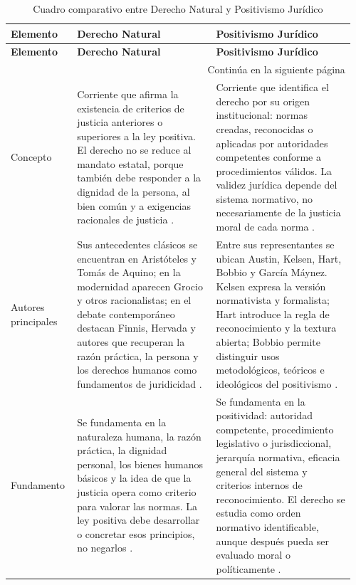 \documentclass[
	spanish, %
	letterpaper, oneside
]{article}
\begin{document}
\clearpage
\pagestyle{empty}
\begin{landscape}
\begingroup
\scriptsize
\setlength{\tabcolsep}{4pt}
\renewcommand{\arraystretch}{1.35}
\begin{longtable}{@{}p{0.18\linewidth}p{0.39\linewidth}p{0.39\linewidth}@{}}
\caption{Cuadro comparativo entre Derecho Natural y Positivismo Jurídico}\label{tab:cuadro-natural-positivismo}\\
\toprule
\textbf{Elemento} & \textbf{Derecho Natural} & \textbf{Positivismo Jurídico} \\
\midrule
\endfirsthead
\toprule
\textbf{Elemento} & \textbf{Derecho Natural} & \textbf{Positivismo Jurídico} \\
\midrule
\endhead
\midrule
\multicolumn{3}{r}{Continúa en la siguiente página} \\
\endfoot
\bottomrule
\endlastfoot

Concepto &
Corriente que afirma la existencia de criterios de justicia anteriores o superiores a la ley positiva. El derecho no se reduce al mandato estatal, porque también debe responder a la dignidad de la persona, al bien común y a exigencias racionales de justicia \citep{finnisEstudiosTeoriaDerecho2017,ruizrodriguezFilosofiaDerecho2009}. &
Corriente que identifica el derecho por su origen institucional: normas creadas, reconocidas o aplicadas por autoridades competentes conforme a procedimientos válidos. La validez jurídica depende del sistema normativo, no necesariamente de la justicia moral de cada norma \citep{rojas-gonzalezFilosofiaDerecho2018,ruizrodriguezFilosofiaDerecho2009}. \\
\midrule

Autores principales &
Sus antecedentes clásicos se encuentran en Aristóteles y Tomás de Aquino; en la modernidad aparecen Grocio y otros racionalistas; en el debate contemporáneo destacan Finnis, Hervada y autores que recuperan la razón práctica, la persona y los derechos humanos como fundamentos de juridicidad \citep{finnisEstudiosTeoriaDerecho2017}. &
Entre sus representantes se ubican Austin, Kelsen, Hart, Bobbio y García Máynez. Kelsen expresa la versión normativista y formalista; Hart introduce la regla de reconocimiento y la textura abierta; Bobbio permite distinguir usos metodológicos, teóricos e ideológicos del positivismo \citep{ruizrodriguezFilosofiaDerecho2009}. \\
\midrule

Fundamento &
Se fundamenta en la naturaleza humana, la razón práctica, la dignidad personal, los bienes humanos básicos y la idea de que la justicia opera como criterio para valorar las normas. La ley positiva debe desarrollar o concretar esos principios, no negarlos \citep{finnisEstudiosTeoriaDerecho2017,LeyGeneralVictimas}. &
Se fundamenta en la positividad: autoridad competente, procedimiento legislativo o jurisdiccional, jerarquía normativa, eficacia general del sistema y criterios internos de reconocimiento. El derecho se estudia como orden normativo identificable, aunque después pueda ser evaluado moral o políticamente \citep{rojas-gonzalezFilosofiaDerecho2018,ruizrodriguezFilosofiaDerecho2009}. \\
\midrule


\end{longtable}
\end{landscape}
\end{document}
